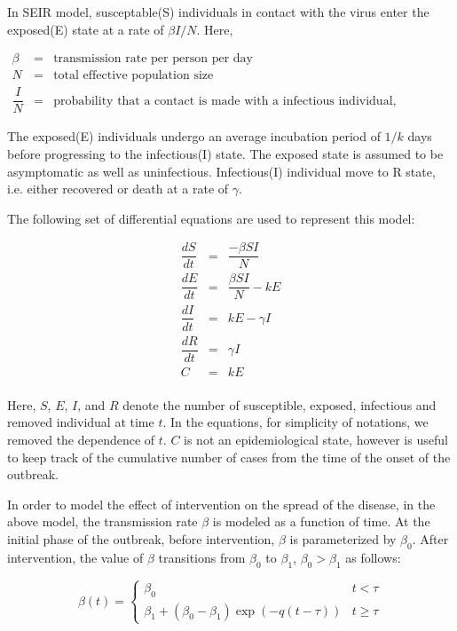 \documentclass[12pt, journal,onecolumn]{IEEEtran}
\begin{document}
In SEIR model, susceptable(S) individuals in contact with the virus enter the exposed(E) state at a rate of $\beta I / N$. Here,

\begin{eqnarray*}
\beta &=& \text{transmission rate per person per day}\\
N &=& \text{total effective population size}\\
\dfrac{I}{N} &=& \text{probability that a contact is made with a infectious individual, assuming random uniform mixing}
\end{eqnarray*}

The exposed(E) individuals undergo an average incubation period of $1/k$ days before progressing to the infectious(I) state. The exposed state is assumed to be asymptomatic as well as uninfectious. Infectious(I) individual move to R state, i.e. either recovered or death at a rate of $\gamma$.

The following set of differential equations are used to represent this model:

\begin{eqnarray}
\label{Eq:SEIR}
\dfrac{dS}{dt}	&=&	\dfrac{-\beta SI}{N}\nonumber\\
\dfrac{dE}{dt}	&=&	\dfrac{\beta SI}{N}-kE\nonumber\\
\dfrac{dI}{dt}	&=&	kE-\gamma I\nonumber\\
\dfrac{dR}{dt}	&=&	\gamma I\nonumber\\
C	&=&	kE\nonumber\\
 \end{eqnarray}
 
 Here, $S$, $E$, $I$, and $R$ denote the number of susceptible, exposed, infectious and removed individual at time $t$. In the equations, for simplicity of notations, we removed the dependence of $t$. $C$ is not an epidemiological state, however is useful to keep track of the cumulative number of cases from the time of the onset of the outbreak.
 
 In order to model the effect of intervention on the spread of the disease, in the above model, the transmission rate $\beta$ is modeled as a function of time. At the initial phase of the outbreak, before intervention, $\beta$ is parameterized by $\beta_0$. After intervention, the value of $\beta$ transitions from $\beta_0$ to $\beta_1$, $\beta_0>\beta_1$ as follows:
 
 \[
\beta(t)=\begin{cases}
\beta_{0} & t<\tau\\
\beta_{1}+(\beta_{0}-\beta_{1})\exp\left(-q\left(t-\tau\right)\right) & t\ge\tau
\end{cases}
\]
\end{document}
